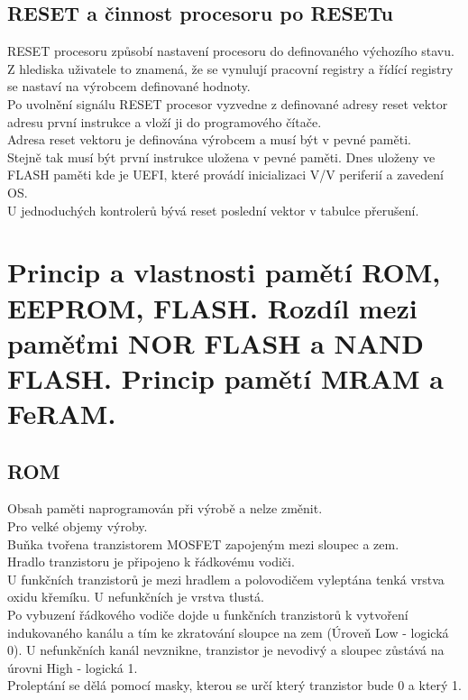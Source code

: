 \subsection{RESET a činnost procesoru po RESETu}
RESET procesoru způsobí nastavení procesoru do definovaného výchozího stavu.\\
Z hlediska uživatele to znamená, že se vynulují pracovní registry a řídící registry se nastaví na výrobcem definované hodnoty.\\
Po uvolnění signálu RESET procesor vyzvedne z definované adresy reset vektor adresu první instrukce a vloží ji do programového čítače.\\
Adresa reset vektoru je definována výrobcem a musí být v pevné paměti.\\
Stejně tak musí být první instrukce uložena v pevné paměti. Dnes uloženy ve FLASH paměti kde je UEFI, které provádí inicializaci V/V periferií a zavedení OS.\\
U jednoduchých kontrolerů bývá reset poslední vektor v tabulce přerušení.\\

\section{Princip a vlastnosti pamětí ROM, EEPROM, FLASH. Rozdíl mezi paměťmi NOR FLASH a NAND FLASH. Princip pamětí MRAM a FeRAM.}
\subsection{ROM}
Obsah paměti naprogramován při výrobě a nelze změnit. \\
Pro velké objemy výroby. \\
Buňka tvořena tranzistorem MOSFET zapojeným mezi sloupec a zem. \\
Hradlo tranzistoru je připojeno k řádkovému vodiči. \\
U funkčních tranzistorů je mezi hradlem a polovodičem vyleptána tenká vrstva oxidu křemíku. U nefunkčních je vrstva tlustá. \\
Po vybuzení řádkového vodiče dojde u funkčních tranzistorů k vytvoření indukovaného kanálu a tím ke zkratování sloupce na zem (Úroveň Low - logická 0). U nefunkčních kanál nevznikne, tranzistor je nevodivý a sloupec zůstává na úrovni High - logická 1. \\
Proleptání se dělá pomocí masky, kterou se určí který tranzistor bude 0 a který 1. \\

